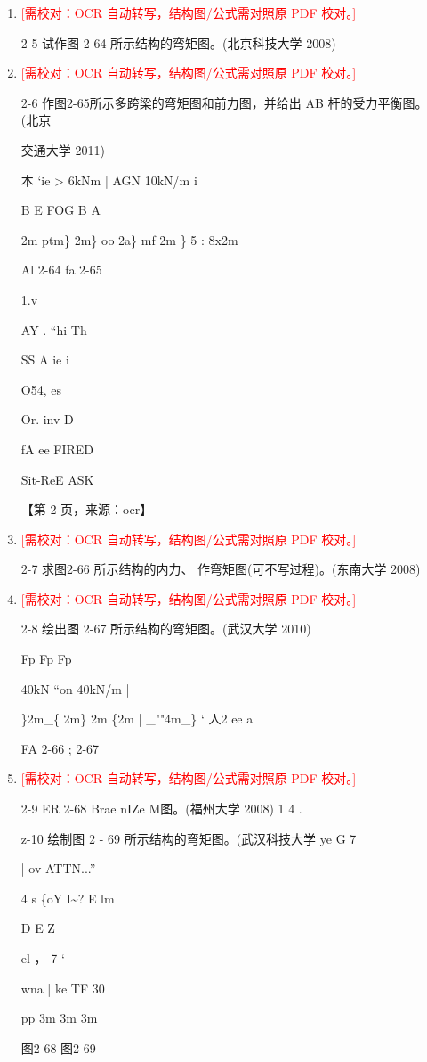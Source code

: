 \documentclass[UTF8,12pt,a4paper,openany]{ctexbook}
\newcommand{\TODO}[1]{\textcolor{red}{[需校对：#1]}}
\begin{document}
\begin{enumerate}[label=\textbf{\arabic*.},leftmargin=2em]
\item \TODO{OCR 自动转写，结构图/公式需对照原 PDF 校对。}\par 2-5 试作图 2-64 所示结构的弯矩图。(北京科技大学 2008)
\item \TODO{OCR 自动转写，结构图/公式需对照原 PDF 校对。}\par 2-6 作图2-65所示多跨梁的弯矩图和前力图，并给出 AB 杆的受力平衡图。 (北京\par 交通大学 2011)\par 本 ‘ie   >     6kNm    | AGN    10kN/m       i\par B                 E    FOG        B       A\par 2m ptm\} 2m\} oo 2a\} mf 2m     \} 5       : 8x2m\par Al 2-64                                         fa 2-65\par 1.v\par AY . “hi Th\par SS A ie i\par O54, es\par Or. inv D\par fA ee FIRED\par Sit-ReE ASK\par \par 【第 2 页，来源：ocr】
\item \TODO{OCR 自动转写，结构图/公式需对照原 PDF 校对。}\par 2-7 求图2-66 所示结构的内力、  作弯矩图(可不写过程)。(东南大学 2008)
\item \TODO{OCR 自动转写，结构图/公式需对照原 PDF 校对。}\par 2-8 绘出图 2-67 所示结构的弯矩图。(武汉大学 2010)\par Fp      Fp            Fp\par 40kN    “on               40kN/m                                                  |\par \}2m\_\{ 2m\} 2m \{2m | \_""4m\_\}       ‘    人2 ee a\par FA 2-66                           ;                                2-67
\item \TODO{OCR 自动转写，结构图/公式需对照原 PDF 校对。}\par 2-9 ER 2-68 Brae nIZe M图。(福州大学 2008)   1           4     .\par z-10 绘制图 2 - 69 所示结构的弯矩图。(武汉科技大学 ye       G 7\par |     ov ATTN...”\par 4 s   \{oY                     I\textasciitilde{}?       E  lm\par D      E       Z\par el ，                      7                       ‘\par wna |             ke            TF 30\par pp                    3m      3m     3m\par 图2-68               图2-69

\end{enumerate}
\end{document}
